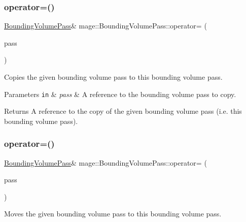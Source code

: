 \subsubsection{\texorpdfstring{operator=()}{operator=()}\hspace{0.1cm}{\footnotesize\ttfamily [1/2]}}
{\footnotesize\ttfamily \hyperlink{classmage_1_1_bounding_volume_pass}{Bounding\+Volume\+Pass}\& mage\+::\+Bounding\+Volume\+Pass\+::operator= (\begin{DoxyParamCaption}\item[{const \hyperlink{classmage_1_1_bounding_volume_pass}{Bounding\+Volume\+Pass} \&}]{pass }\end{DoxyParamCaption})\hspace{0.3cm}{\ttfamily [delete]}}

Copies the given bounding volume pass to this bounding volume pass.


\begin{DoxyParams}[1]{Parameters}
\mbox{\tt in}  & {\em pass} & A reference to the bounding volume pass to copy. \\
\hline
\end{DoxyParams}
\begin{DoxyReturn}{Returns}
A reference to the copy of the given bounding volume pass (i.\+e. this bounding volume pass). 
\end{DoxyReturn}
\hypertarget{classmage_1_1_bounding_volume_pass_aa668ce31d98e83cab99184ea3289d85f}{}\label{classmage_1_1_bounding_volume_pass_aa668ce31d98e83cab99184ea3289d85f} 
\subsubsection{\texorpdfstring{operator=()}{operator=()}\hspace{0.1cm}{\footnotesize\ttfamily [2/2]}}
{\footnotesize\ttfamily \hyperlink{classmage_1_1_bounding_volume_pass}{Bounding\+Volume\+Pass}\& mage\+::\+Bounding\+Volume\+Pass\+::operator= (\begin{DoxyParamCaption}\item[{\hyperlink{classmage_1_1_bounding_volume_pass}{Bounding\+Volume\+Pass} \&\&}]{pass }\end{DoxyParamCaption})\hspace{0.3cm}{\ttfamily [delete]}}

Moves the given bounding volume pass to this bounding volume pass.



